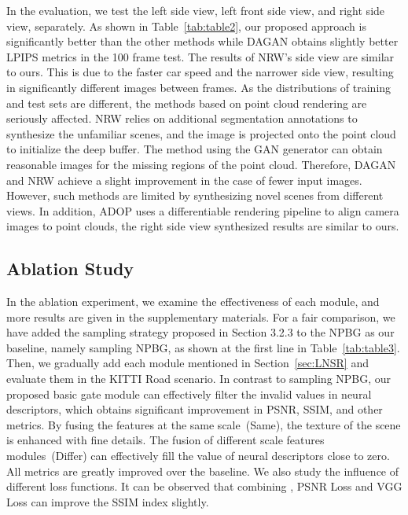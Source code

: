 \documentclass[sigconf]{acmart}
\begin{document}
In the evaluation, we test the left side view, left front side view, and right side view, separately. As shown in Table~\ref{tab:table2}, our proposed approach is significantly better than the other methods while DAGAN obtains slightly better LPIPS metrics in the 100 frame test. The results of NRW's side view are similar to ours. This is due to the faster car speed and the narrower side view, resulting in significantly different images between frames. As the distributions of training and test sets are different, the methods based on point cloud rendering are seriously affected. NRW relies on additional segmentation annotations to synthesize the unfamiliar scenes, and the image is projected onto the point cloud to initialize the deep buffer. The method using the GAN generator can obtain reasonable images for the missing regions of the point cloud. Therefore, DAGAN and NRW achieve a slight improvement in the case of fewer input images. However, such methods are limited by synthesizing novel scenes from different views. In addition, ADOP uses a differentiable rendering pipeline to align camera images to point clouds, the right side view synthesized results are similar to ours.
 






\subsection{Ablation Study}
In the ablation experiment, we examine the effectiveness of each module, and more results are given in the supplementary materials. For a fair comparison, we have added the sampling strategy proposed in Section 3.2.3 to the NPBG as our baseline, namely sampling NPBG, as shown at the first line in Table~\ref{tab:table3}. Then, we gradually add each module mentioned in Section~\ref{sec:LNSR} and evaluate them in the KITTI Road scenario. In contrast to sampling NPBG, our proposed basic gate module can effectively filter the invalid values in neural descriptors, which obtains significant improvement in PSNR, SSIM, and other metrics. By fusing the features at the same scale~(Same), the texture of the scene is enhanced with fine details. The fusion of different scale features modules~(Differ) can effectively fill the value of neural descriptors close to zero. All metrics are greatly improved over the baseline. We also study the influence of different loss functions. It can be observed that combining , PSNR Loss  and VGG Loss can improve the SSIM index slightly.
\end{document}

